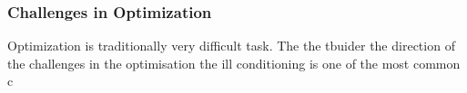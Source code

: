 \subsubsection{Challenges in Optimization}

Optimization is traditionally very difficult task. The the tbuider the direction of the challenges in the optimisation 
the ill conditioning is one of the most common c